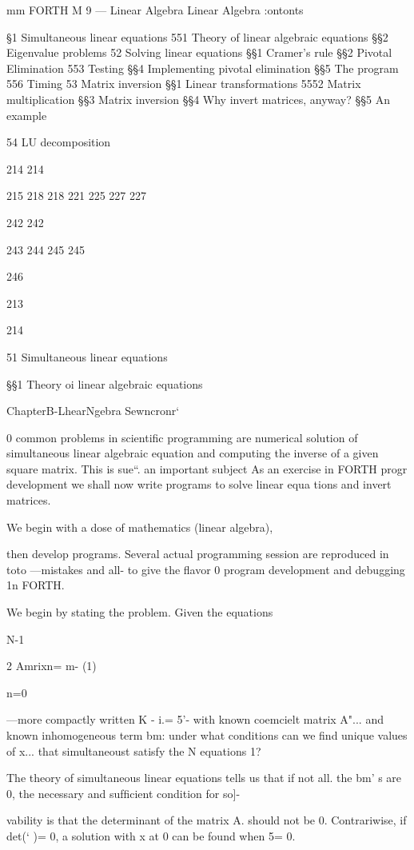 mm FORTH M 9 — Linear Algebra
Linear Algebra
:ontonts

§1 Simultaneous linear equations
551 Theory of linear algebraic equations
§§2 Eigenvalue problems
52 Solving linear equations
§§1 Cramer's rule
§§2 Pivotal Elimination
553 Testing
§§4 Implementing pivotal elimination
§§5 The program
556 Timing
53 Matrix inversion
§§1 Linear transformations
5552 Matrix multiplication
§§3 Matrix inversion
§§4 Why invert matrices, anyway?
§§5 An example

54 LU decomposition

214
214

215
218
218
221
225
227
227

242
242

243
244
245
245

246

213

214

51 Simultaneous linear equations

§§1 Theory oi linear algebraic equations

ChapterB-LhearNgebra Sewncronr‘

      
 
   
 

0 common problems in scientiﬁc programming are
numerical solution of simultaneous linear algebraic equation
and computing the inverse of a given square matrix. This is sue“.
an important subject As an exercise in FORTH progr
development we shall now write programs to solve linear equa
tions and invert matrices.

We begin with a dose of mathematics (linear algebra),

then develop programs. Several actual programming session
are reproduced in toto —mistakes and all- to give the ﬂavor 0
program development and debugging 1n FORTH.

We begin by stating the problem. Given the equations

N-1

2 Amrixn= m- (1)

n=0

—more compactly written K - i.= 5'- with known coemcielt
matrix A"... and known inhomogeneous term bm: under what
conditions can we ﬁnd unique values of x... that simultaneoust
satisfy the N equations 1?

The theory of simultaneous linear equations tells us that if not all.
the bm’ s are 0, the necessary and sufﬁcient condition for so]-

vability is that the determinant of the matrix A. should not be 0.
Contrariwise, if det(‘ )= 0, a solution with x at 0 can be found
when 5= 0.

